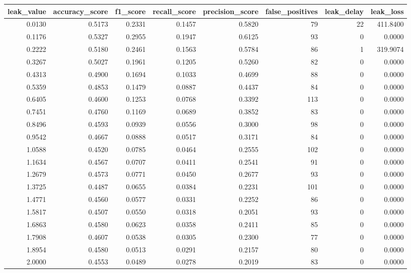 \begin{tabular}{rrrrrrrr}
\toprule
leak\_value & accuracy\_score & f1\_score & recall\_score & precision\_score & false\_positives & leak\_delay & leak\_loss \\
\midrule
0.0130 & 0.5173 & 0.2331 & 0.1457 & 0.5820 & 79 & 22 & 411.8400 \\
0.1176 & 0.5327 & 0.2955 & 0.1947 & 0.6125 & 93 & 0 & 0.0000 \\
0.2222 & 0.5180 & 0.2461 & 0.1563 & 0.5784 & 86 & 1 & 319.9074 \\
0.3267 & 0.5027 & 0.1961 & 0.1205 & 0.5260 & 82 & 0 & 0.0000 \\
0.4313 & 0.4900 & 0.1694 & 0.1033 & 0.4699 & 88 & 0 & 0.0000 \\
0.5359 & 0.4853 & 0.1479 & 0.0887 & 0.4437 & 84 & 0 & 0.0000 \\
0.6405 & 0.4600 & 0.1253 & 0.0768 & 0.3392 & 113 & 0 & 0.0000 \\
0.7451 & 0.4760 & 0.1169 & 0.0689 & 0.3852 & 83 & 0 & 0.0000 \\
0.8496 & 0.4593 & 0.0939 & 0.0556 & 0.3000 & 98 & 0 & 0.0000 \\
0.9542 & 0.4667 & 0.0888 & 0.0517 & 0.3171 & 84 & 0 & 0.0000 \\
1.0588 & 0.4520 & 0.0785 & 0.0464 & 0.2555 & 102 & 0 & 0.0000 \\
1.1634 & 0.4567 & 0.0707 & 0.0411 & 0.2541 & 91 & 0 & 0.0000 \\
1.2679 & 0.4573 & 0.0771 & 0.0450 & 0.2677 & 93 & 0 & 0.0000 \\
1.3725 & 0.4487 & 0.0655 & 0.0384 & 0.2231 & 101 & 0 & 0.0000 \\
1.4771 & 0.4560 & 0.0577 & 0.0331 & 0.2252 & 86 & 0 & 0.0000 \\
1.5817 & 0.4507 & 0.0550 & 0.0318 & 0.2051 & 93 & 0 & 0.0000 \\
1.6863 & 0.4580 & 0.0623 & 0.0358 & 0.2411 & 85 & 0 & 0.0000 \\
1.7908 & 0.4607 & 0.0538 & 0.0305 & 0.2300 & 77 & 0 & 0.0000 \\
1.8954 & 0.4580 & 0.0513 & 0.0291 & 0.2157 & 80 & 0 & 0.0000 \\
2.0000 & 0.4553 & 0.0489 & 0.0278 & 0.2019 & 83 & 0 & 0.0000 \\
\bottomrule
\end{tabular}
